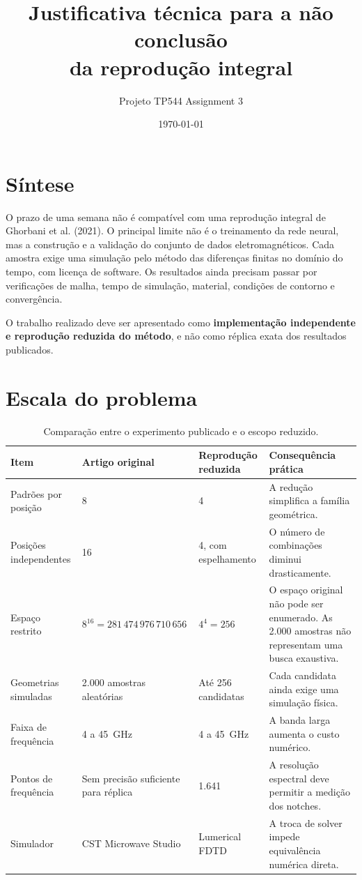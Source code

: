 \documentclass[11pt,a4paper]{article}
\title{Justificativa técnica para a não conclusão\\da reprodução integral}
\author{Projeto TP544 Assignment 3}
\date{\today}
\begin{document}
\maketitle

\section{Síntese}

O prazo de uma semana não é compatível com uma reprodução integral de Ghorbani et al. (2021). O principal limite não é o treinamento da rede neural, mas a construção e a validação do conjunto de dados eletromagnéticos. Cada amostra exige uma simulação pelo método das diferenças finitas no domínio do tempo, com licença de software. Os resultados ainda precisam passar por verificações de malha, tempo de simulação, material, condições de contorno e convergência.

O trabalho realizado deve ser apresentado como \textbf{implementação independente e reprodução reduzida do método}, e não como réplica exata dos resultados publicados.

\section{Escala do problema}

\begin{table}[htbp]
\centering
\small
\caption{Comparação entre o experimento publicado e o escopo reduzido.}
\label{tab:escala}
\begin{tabularx}{\textwidth}{@{}p{}p{}p{}Y@{}}
\toprule
Item & Artigo original & Reprodução reduzida & Consequência prática \\
\midrule
Padrões por posição & 8 & 4 & A redução simplifica a família geométrica. \\
\addlinespace
Posições independentes & 16 & 4, com espelhamento & O número de combinações diminui drasticamente. \\
\addlinespace
Espaço restrito & $8^{16}=281\,474\,976\,710\,656$ & $4^4=256$ & O espaço original não pode ser enumerado. As 2.000 amostras não representam uma busca exaustiva. \\
\addlinespace
Geometrias simuladas & 2.000 amostras aleatórias & Até 256 candidatas & Cada candidata ainda exige uma simulação física. \\
\addlinespace
Faixa de frequência & 4 a 45~GHz & 4 a 45~GHz & A banda larga aumenta o custo numérico. \\
\addlinespace
Pontos de frequência & Sem precisão suficiente para réplica & 1.641 & A resolução espectral deve permitir a medição dos notches. \\
\addlinespace
Simulador & CST Microwave Studio & Lumerical FDTD & A troca de solver impede equivalência numérica direta. \\
\bottomrule
\end{tabularx}
\end{table}
\end{document}
